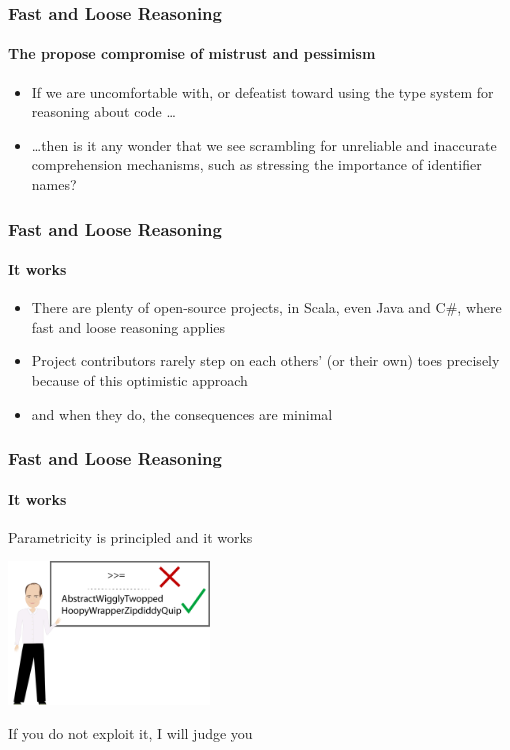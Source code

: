 \begin{frame}[fragile]
\frametitle{Fast and Loose Reasoning}
\framesubtitle{The propose compromise of mistrust and pessimism}
\begin{itemize}
  \item<1> If we are uncomfortable with, or defeatist toward using the type system for reasoning about code \ldots
  \item<2> \ldots then is it any wonder that we see scrambling for unreliable and inaccurate comprehension mechanisms, such as stressing the importance of identifier names?
\end{itemize}
\end{frame}

\begin{frame}[fragile]
\frametitle{Fast and Loose Reasoning}
\framesubtitle{It works}
\begin{itemize}
  \item<1> There are plenty of open-source projects, in Scala, even Java and C\#, where fast and loose reasoning applies
  \item<2> Project contributors rarely step on each others' (or their own) toes precisely because of this optimistic approach
  \item<3> and when they do, the consequences are minimal
\end{itemize}
\end{frame}

\begin{frame}[fragile]
\frametitle{Fast and Loose Reasoning}
\framesubtitle{It works}
\begin{center}
Parametricity is principled and it works
\end{center}
\begin{center}
\includegraphics[height=3.8cm]{image/AbstractWigglyTwoppedHoopyWrapperZipdiddyQuip.png}
\end{center}
\begin{center}
If you do not exploit it, I will judge you
\end{center}
\end{frame}